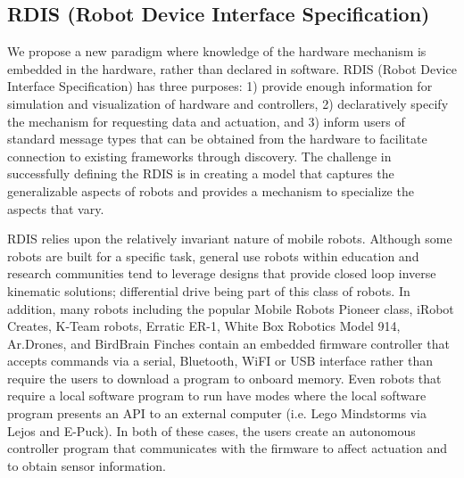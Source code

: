 \subsection{RDIS (Robot Device Interface Specification)}
We propose a new paradigm where knowledge of the hardware mechanism is embedded in the hardware, rather than declared in software.  RDIS (Robot Device Interface Specification) has three purposes: 1) provide enough information for simulation and visualization of hardware and controllers, 2) declaratively specify the mechanism for requesting data and actuation, and 3) inform users of standard message types that can be obtained from the hardware to facilitate connection to existing frameworks through discovery.  The challenge in successfully defining the RDIS is in creating a model that captures the generalizable aspects of robots and provides a mechanism to specialize the aspects that vary.

RDIS relies upon the relatively invariant nature of mobile robots.  Although some robots are built for a specific task, general use robots within education and research communities tend to leverage designs that provide closed loop inverse kinematic solutions; differential drive being part of this class of robots.  In addition, many robots including the popular Mobile Robots Pioneer class, iRobot Creates, K-Team robots, Erratic ER-1, White Box Robotics Model 914, Ar.Drones, and BirdBrain Finches
\monica{[references?]}
contain an embedded firmware controller that accepts commands via a serial, Bluetooth, WiFI or USB interface rather than require the users to download a program to onboard memory.  Even robots that require a local software program to run have modes where the local software program presents an API to an external computer (i.e. Lego Mindstorms via Lejos and E-Puck).  In both of these cases, the users create an autonomous controller program that communicates with the firmware to affect actuation and to obtain sensor information.  


